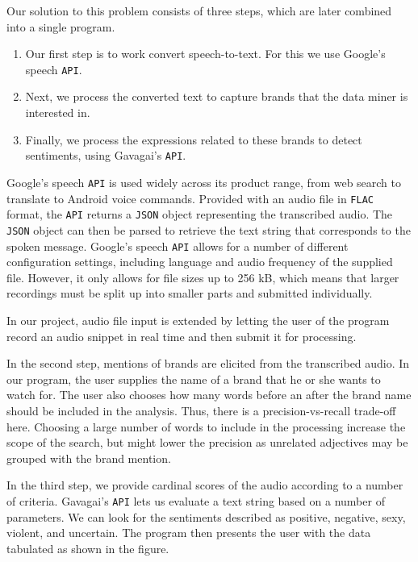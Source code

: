 \documentclass[a4paper,12pt,twoside]{ltxdoc}
\begin{document}
Our solution to this problem consists of three steps, which are later combined into a single program.

\begin{enumerate}
\item Our first step is to work convert speech-to-text. For this we use Google's speech \verb#API#.

\item Next, we process the converted text to capture brands that the data miner is interested in.

\item Finally, we process the expressions related to these brands to detect sentiments, using Gavagai's \verb#API#.
\end{enumerate}

Google's speech \verb#API# is used widely across its product range, from web search to translate to Android voice commands.
Provided with an audio file in \verb#FLAC# format, the \verb#API# returns a \verb#JSON# object representing the transcribed audio. The \verb#JSON# object
can then be parsed to retrieve the text string that corresponds to the spoken message. Google's speech \verb#API# allows for a number
of different configuration settings, including language and audio frequency of the supplied file. However, it only allows for file sizes up to 256 kB, 
which means that larger recordings must be split up into smaller parts and submitted individually.

In our project, audio file input is extended by letting the user of the program record an audio snippet in real time and
then submit it for processing.

In the second step, mentions of brands are elicited from the transcribed audio. In our program, the user supplies the name
of a brand that he or she wants to watch for. The user also chooses how many words before an after the brand name should
be included in the analysis. Thus, there is a precision-vs-recall trade-off here. Choosing a large number of words to include
in the processing increase the scope of the search, but might lower the precision as unrelated adjectives may be grouped
with the brand mention.

In the third step, we provide cardinal scores of the audio according to a number of criteria. Gavagai's \verb#API# lets us
evaluate a text string based on a number of parameters. We can look for the sentiments described as positive, negative, sexy, violent,
and uncertain. The program then presents the user with the data tabulated as shown in the figure. %
\end{document}
